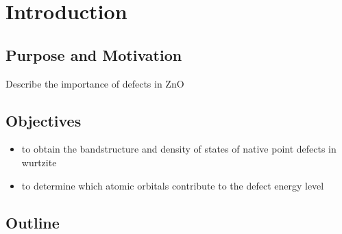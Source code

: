 \addchapheadtotoc
\chapter{Introduction}
\section{Purpose and Motivation}
Describe the importance of defects in ZnO
\section{Objectives}
\begin{itemize}
    \item to obtain the bandstructure and density of states of native point defects in wurtzite 
    \item to determine which atomic orbitals  contribute to the defect energy level
\end{itemize}
\section{Outline}

